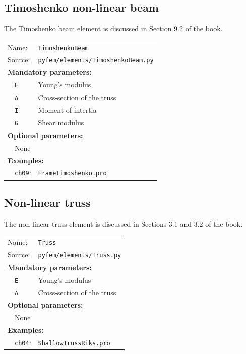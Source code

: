 \documentclass{article}
\begin{document}
\subsection{Timoshenko non-linear beam}

The Timoshenko beam element is discussed in Section 9.2 of the book.

\vspace{2mm}
\begin{tabular}{p{22mm}p{74mm}}
Name:         & \texttt{TimoshenkoBeam} \\
Source:  & \texttt{pyfem/elements/TimoshenkoBeam.py} \\
\multicolumn{2}{l}{\textbf{Mandatory parameters:}} \\
~~\texttt{E} & Young's modulus\\
~~\texttt{A} & Cross-section of the truss\\
~~\texttt{I} & Moment of intertia\\
~~\texttt{G} & Shear modulus\\
\multicolumn{2}{l}{\textbf{Optional parameters:}} \\ 
~~None  & \\
\multicolumn{2}{l}{\textbf{Examples:}}\\
~~\texttt{ch09}: & \texttt{FrameTimoshenko.pro}
\end{tabular}


\subsection{Non-linear truss}

The non-linear truss element is discussed in Sections 3.1 and 3.2 of the book.

\vspace{2mm}
\begin{tabular}{p{22mm}p{74mm}}
Name:         & \texttt{Truss} \\
Source:  & \texttt{pyfem/elements/Truss.py} \\
\multicolumn{2}{l}{\textbf{Mandatory parameters:}} \\
~~\texttt{E} & Young's modulus\\
~~\texttt{A} & Cross-section of the truss\\
\multicolumn{2}{l}{\textbf{Optional parameters:}} \\ 
~~None  & \\
\multicolumn{2}{l}{\textbf{Examples:}}\\
~~\texttt{ch04}: & \texttt{ShallowTrussRiks.pro}
\end{tabular}
\end{document}
